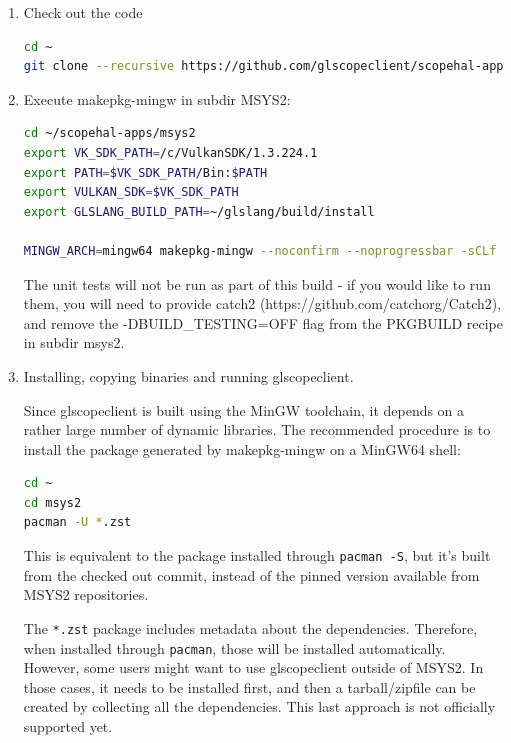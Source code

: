 \begin{enumerate}
\item Check out the code

\begin{lstlisting}[language=sh, numbers=none]
cd ~
git clone --recursive https://github.com/glscopeclient/scopehal-apps
\end{lstlisting}

\item Execute makepkg-mingw in subdir MSYS2:

\begin{lstlisting}[language=sh, numbers=none]
cd ~/scopehal-apps/msys2
export VK_SDK_PATH=/c/VulkanSDK/1.3.224.1
export PATH=$VK_SDK_PATH/Bin:$PATH
export VULKAN_SDK=$VK_SDK_PATH
export GLSLANG_BUILD_PATH=~/glslang/build/install

MINGW_ARCH=mingw64 makepkg-mingw --noconfirm --noprogressbar -sCLf
\end{lstlisting}

The unit tests will not be run as part of this build - if you would like to run them, you will need to provide catch2
(https://github.com/catchorg/Catch2), and remove the -DBUILD\_TESTING=OFF flag from the PKGBUILD recipe in subdir
msys2.

\item Installing, copying binaries and running glscopeclient.

Since glscopeclient is built using the MinGW toolchain, it depends on a rather large number of dynamic libraries.
The recommended procedure is to install the package generated by makepkg-mingw on a MinGW64 shell:

\begin{lstlisting}[language=sh, numbers=none]
cd ~
cd msys2
pacman -U *.zst
\end{lstlisting}

This is equivalent to the package installed through \lstinline{pacman -S}, but it's built from the checked out commit,
instead of the pinned version available from MSYS2 repositories.

The \lstinline{*.zst} package includes metadata about the dependencies.
Therefore, when installed through \lstinline{pacman}, those will be installed automatically.
However, some users might want to use glscopeclient outside of MSYS2.
In those cases, it needs to be installed first, and then a tarball/zipfile can be created by collecting all the dependencies.
This last approach is not officially supported yet.

\end{enumerate}

